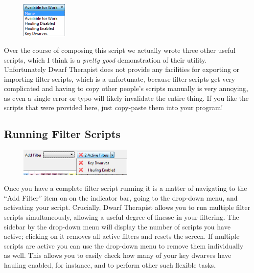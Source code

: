 \documentclass[]{article}
\begin{document}
\newpage
\begin{figure}
\vspace{-5pt}
  \begin{center}
    \includegraphics[width=0.2\textwidth]{Sec4Fig4}
  \end{center}
\vspace{-15pt}
\end{figure}
Over the course of composing this script we actually wrote three other useful scripts, which I think is a
\emph{pretty good} demonstration of their utility. Unfortunately Dwarf
Therapist does not provide any facilities for exporting or importing filter scripts, which is a
unfortunate, because filter scripts get very complicated and having to copy other people's scripts
manually is very annoying, as even a single error or typo will likely invalidate the entire thing.
If you like the scripts that were provided here, just copy-paste them into your program!

\subsection{Running Filter Scripts}
\label{sec:Running Filter Scripts}
\begin{figure}
  \begin{center}
  \vspace{-20pt}
    \includegraphics[width=0.5\textwidth]{Sec4Fig4+}
  \vspace{-20pt}
  \end{center}
\end{figure}

Once you have a complete filter script running it is a matter of navigating to the ``Add Filter'' item
on on the indicator bar, going to the drop-down menu, and activating your script. Crucially, Dwarf
Therapist allows you to run multiple filter scripts simultaneously, allowing a useful degree of finesse
in your filtering. The sidebar by the drop-down menu will display the number of scripts you have active;
clicking on it removes all active filters and resets the screen. If multiple scripts are active you can
use the drop-down menu to remove them individually as well. This allows you to easily check
how many of your key dwarves have hauling enabled, for instance, and to perform other such flexible
tasks.
\end{document}
